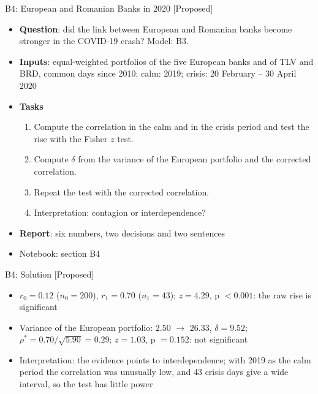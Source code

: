 \begin{frame}{B4: European and Romanian Banks in 2020 [Proposed]}
\itemsize{\footnotesize}
\begin{itemize}
\item \textbf{Question}: did the link between European and Romanian banks become stronger in the COVID-19 crash? Model: B3.
\item \textbf{Inputs}: equal-weighted portfolios of the five European banks and of TLV and BRD, common days since 2010; calm: 2019; crisis: 20 February -- 30 April 2020
\item \textbf{Tasks}
\begin{enumerate}
    \item Compute the correlation in the calm and in the crisis period and test the rise with the Fisher $z$ test.
    \item Compute $\delta$ from the variance of the European portfolio and the corrected correlation.
    \item Repeat the test with the corrected correlation.
    \item Interpretation: contagion or interdependence?
\end{enumerate}
\item \textbf{Report}: six numbers, two decisions and two sentences
\item Notebook: section B4
\end{itemize}
\end{frame}

\ifsolutions
\begin{frame}{B4: Solution [Proposed]}
\itemsize{\footnotesize}
\begin{itemize}
    \item $r_0 = 0.12$ ($n_0 = 200$), $r_1 = 0.70$ ($n_1 = 43$); $z = 4.29$, p $< 0.001$: the raw rise is significant
    \item Variance of the European portfolio: $2.50$ $\to$ $26.33$, $\delta = 9.52$; $\rho^* = 0.70/\sqrt{5.90} = 0.29$; $z = 1.03$, p $= 0.152$: not significant
    \item Interpretation: the evidence points to interdependence; with 2019 as the calm period the correlation was unusually low, and 43 crisis days give a wide interval, so the test has little power
\end{itemize}
\end{frame}
\fi

